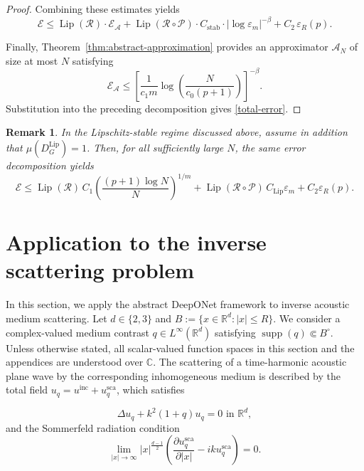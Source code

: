 \documentclass{article}
\numberwithin{equation}{section}
\theoremstyle{plain}
\newtheorem{remark}{Remark}[section]
\newcommand{\Lip}{\operatorname{Lip}}
\begin{document}
\begin{proof}
		Combining these estimates yields
		\begin{equation*}
			\mathscr{E}
			\leq
			\Lip(\mathcal{R})\cdot \mathscr{E}_{\mathcal{A}}
			+
			\Lip(\mathcal{R}\circ\mathcal{P})\cdot C_{\mathrm{stab}}\cdot |\log \varepsilon_m|^{-\beta}
			+
			C_2\,\varepsilon_R(p).
		\end{equation*}
		
		Finally, Theorem~\ref{thm:abstract-approximation} provides an approximator $\mathcal A_N$ of size at most $N$ satisfying
		\begin{equation*}
			\mathscr E_{\mathcal A}
			\le
			\left[
			\frac{1}{c_1m}
			\log\!\left(\frac{N}{c_0(p+1)}\right)
			\right]^{-\beta}.
		\end{equation*}
		Substitution into the preceding decomposition gives \eqref{total-error}.
	\end{proof}
	
	\begin{remark}
		In the Lipschitz-stable regime discussed above, assume in addition that $\mu(D_G^{\mathrm{Lip}})=1$. Then, for all sufficiently large $N$, the same error decomposition yields
		\begin{equation*}
			\mathscr E
			\le
			\Lip(\mathcal R)\,C_1
			\left(\frac{(p+1)\log N}{N}\right)^{1/m}
			+
			\Lip(\mathcal R\circ\mathcal P)\,C_{\mathrm{Lip}}\varepsilon_m
			+
			C_2\varepsilon_R(p).
		\end{equation*}
	\end{remark}
	
	\section{Application to the inverse scattering problem}\label{section4}
	
	In this section, we apply the abstract DeepONet framework to inverse acoustic medium scattering. Let $d\in\{2,3\}$ and $B:=\{x\in\mathbb R^d:|x|\le R\}$. We consider a complex-valued medium contrast $q\in L^\infty(\mathbb R^d)$ satisfying $\operatorname{supp}(q)\Subset B^\circ$. Unless otherwise stated, all scalar-valued function spaces in this section and the appendices are understood over $\mathbb C$. The scattering of a time-harmonic acoustic plane wave by the corresponding inhomogeneous medium is described by the total field $u_q=u^{\mathrm{inc}}+u_q^{\mathrm{sca}}$, which satisfies
	
	\begin{equation}\label{eq:1.1}
		\Delta u_{q}+k^{2}(1+q) u_{q}=0 \text{ in } \mathbb{R}^{d},
	\end{equation}
	and the Sommerfeld radiation condition 
	\begin{equation}\label{eq:1.2}
		\lim _{|x| \to \infty}|x|^{\frac{d-1}{2}}\left(\frac{\partial u_{q}^{\mathrm{sca}}}{\partial|x|}-i k u_{q}^{\mathrm{sca} }\right)=0.
	\end{equation}
	
\end{document}
